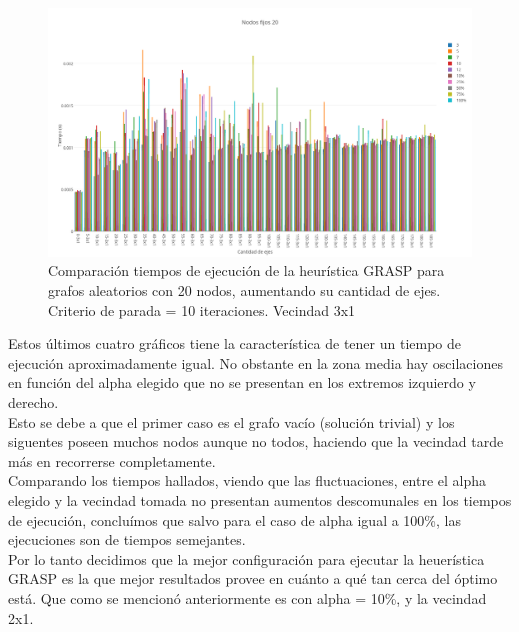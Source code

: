   \begin{figure}[h!]
   \begin{center}
 	\includegraphics[scale=0.35]{imagenes/grasp/20nodos-10repes-v2.png}
 	\caption{Comparaci\'on tiempos de ejecuci\'on de la heur\'istica GRASP para grafos aleatorios con 20 nodos, aumentando su cantidad de ejes. Criterio de parada = 10 iteraciones. Vecindad 3x1}
   \end{center}
 \end{figure}
\newpage

Estos \'ultimos cuatro gr\'aficos tiene la caracter\'istica de tener un tiempo de ejecuci\'on aproximadamente igual. No obstante en la zona media hay oscilaciones en funci\'on del alpha elegido que no se presentan en los extremos izquierdo y derecho.\\

Esto se debe a que el primer caso es el grafo vac\'io (soluci\'on trivial) y los siguentes poseen muchos nodos aunque no todos, haciendo que la vecindad tarde m\'as en recorrerse completamente.\\

Comparando los tiempos hallados, viendo que las fluctuaciones, entre el alpha elegido y la vecindad tomada no presentan aumentos descomunales en los tiempos de ejecuci\'on, conclu\'imos que salvo para el caso de alpha igual a 100\%, las ejecuciones son de tiempos semejantes.\\

Por lo tanto decidimos que la mejor configuraci\'on para ejecutar la heuer\'istica GRASP es la que mejor resultados provee en cu\'anto a qu\'e tan cerca del \'optimo est\'a. Que como se mencion\'o anteriormente es con alpha = 10\%, y la vecindad 2x1.

